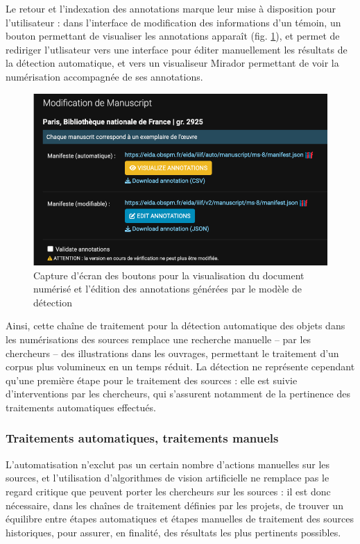 	Le retour et l'indexation des annotations marque leur mise à disposition pour l'utilisateur : dans l'interface de modification des informations d'un témoin, un bouton permettant de visualiser les annotations apparaît (fig. \ref{fig:eida_buttons}), et permet de rediriger l'utlisateur vers une interface pour éditer manuellement les résultats de la détection automatique, et vers un visualiseur Mirador permettant de voir la numérisation accompagnée de ses annotations.	
	
	\begin{figure}[h]
		\centering
		\includegraphics[width=12cm]{images/eida_buttons.png}
		\caption{Capture d'écran des boutons pour la visualisation du document numérisé et l'édition des annotations générées par le modèle de détection}
		\label{fig:eida_buttons}
	\end{figure}
	
	Ainsi, cette chaîne de traitement pour la détection automatique des objets dans les numérisations des sources remplace une recherche manuelle -- par les chercheurs -- des illustrations dans les ouvrages, permettant le traitement d'un corpus plus volumineux en un temps réduit. La détection ne représente cependant qu'une première étape pour le traitement des sources : elle est suivie d'interventions par les chercheurs, qui s'assurent notamment de la pertinence des traitements automatiques effectués.

    \subsubsection{Traitements automatiques, traitements manuels}
   	L'automatisation n'exclut pas un certain nombre d'actions manuelles sur les sources, et l'utilisation d'algorithmes de vision artificielle ne remplace pas le regard critique que peuvent porter les chercheurs sur les sources : il est donc nécessaire, dans les chaînes de traitement définies par les projets, de trouver un équilibre entre étapes automatiques et étapes manuelles de traitement des sources historiques, pour assurer, en finalité, des résultats les plus pertinents possibles.
   	
